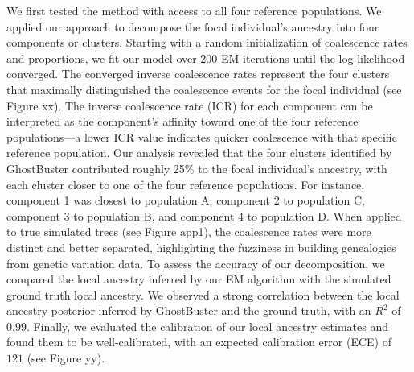 
We first tested the method with access to all four reference populations. We applied our approach to decompose the focal individual's ancestry into four components or clusters. Starting with a random initialization of coalescence rates and proportions, we fit our model over 200 EM iterations until the log-likelihood converged. The converged inverse coalescence rates represent the four clusters that maximally distinguished the coalescence events for the focal individual (see Figure xx). The inverse coalescence rate (ICR) for each component can be interpreted as the component's affinity toward one of the four reference populations—a lower ICR value indicates quicker coalescence with that specific reference population. Our analysis revealed that the four clusters identified by GhostBuster contributed roughly 25\% to the focal individual's ancestry, with each cluster closer to one of the four reference populations. For instance, component 1 was closest to population A, component 2 to population C, component 3 to population B, and component 4 to population D. When applied to true simulated trees (see Figure app1), the coalescence rates were more distinct and better separated, highlighting the fuzziness in building genealogies from genetic variation data. To assess the accuracy of our decomposition, we compared the local ancestry inferred by our EM algorithm with the simulated ground truth local ancestry. We observed a strong correlation between the local ancestry posterior inferred by GhostBuster and the ground truth, with an $R^2$ of $0.99$. Finally, we evaluated the calibration of our local ancestry estimates and found them to be well-calibrated, with an expected calibration error (ECE) of $121$ (see Figure yy).


